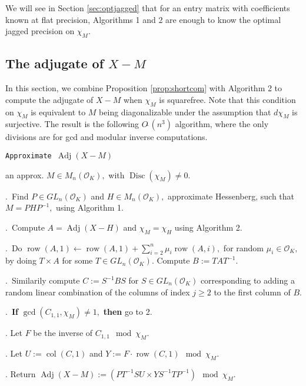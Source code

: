 \documentclass{sig-alternate-05-2015}
\DeclareMathOperator{\adj}{Adj}
\DeclareMathOperator{\disc}{Disc}
\DeclareMathOperator{\row}{row}
\DeclareMathOperator{\col}{col}
\newcommand{\OK}{\mathcal{O}_K}
\newcommand{\softO}{O\tilde{~}}
\begin{document}
We will see in Section \ref{sec:optjagged} that for an
entry matrix with coefficients known at flat precision,
Algorithms 1 and 2 are enough to
know the optimal jagged precision on $\chi_M.$

\subsection{The adjugate of $X{-}M$}

In this section, we combine Proposition \ref{prop:shortcom}
with Algorithm 2 to compute the adjugate of $X-M$
when $\chi_M$ is squarefree.   Note that this condition on
$\chi_M$ is equivalent to $M$ being diagonalizable under
the assumption that $d\chi_M$ is surjective.  The result is
the following $\softO(n^3)$ algorithm, where the only
divisions are for gcd and modular inverse computations.

\noindent\hrulefill

 {\tt Approximate $\adj (X{-}M)$ }

 an approx. $M \in M_n(\OK),$ with $\disc(\chi_M) \neq 0.$ 

\smallskip

.\ Find $P \in GL_n(\OK)$ and $H \in M_n(\OK),$ approximate Hessenberg,
such that $M=PHP^{-1},$ using Algorithm 1. 

.\ Compute $A=\adj (X-H)$ and $\chi_M = \chi_H$ using Algorithm 2.


.\ Do $\row(A,1) \leftarrow \row(A,1)+\sum_{i=2}^n \mu_i \row(A,i),$ for
random $\mu_i \in \OK,$ by doing $T \times A$ for some $T \in GL_n(\OK).$
Compute $B:=TAT^{-1}.$

.\ Similarily compute $C:=S^{-1}BS$ for $S \in GL_n(\OK)$ corresponding to
adding a random linear combination of the columns of index $j \ge 2$
to the first column of $B.$ 

.\  \textbf{If} $\gcd(C_{1,1}, \chi_M) \neq 1,$ \textbf{then} go to 2.

. Let $F$ be the inverse of $C_{1,1} \mod \chi_M$.

. Let $U := \col(C,1)$ and $Y := F \cdot \row(C,1) \mod \chi_M$.

. Return $\adj(X-M):=(PT^{-1}S U \times Y S^{-1} T P^{-1}) \mod \chi_M.$

\vspace{-1ex}\noindent\hrulefill

\medskip
\end{document}
